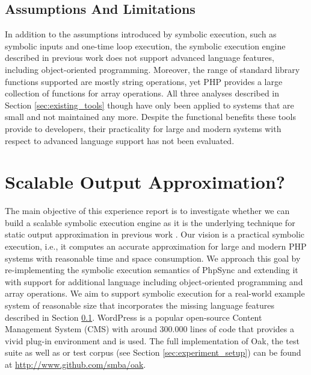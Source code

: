 \documentclass[sigconf]{acmart}
\renewcommand{\sf}[1]{\textsf{#1}}
\begin{document}
\subsection{Assumptions And Limitations}\label{sec:limitations}
In addition to the assumptions introduced by symbolic execution, such as
symbolic inputs and one-time loop execution, the symbolic execution
engine described in previous work \cite{Nguyen:2014:BCG:2635868.2635928} does
not support advanced language features, including object-oriented programming. Moreover, the range of
standard library functions supported are mostly string operations, yet PHP
provides a large collection of functions for array operations.
All three analyses described in Section \ref{sec:existing_tools} though have
only been applied to systems that are small and not maintained any more. Despite the
functional benefits these tools provide to developers, their practicality for
large and modern systems with respect to advanced language support has not been
evaluated.

\section{Scalable Output Approximation?} \label{sec:3}
The main objective of this experience report is to investigate whether we can
build a scalable symbolic execution engine as it is the underlying technique
for static output approximation in previous work
\cite{Nguyen:2011:AFH:2190078.2190142,Nguyen:2014:BCG:2635868.2635928,Nguyen:2015:CPS:2786805.2786872,Nguyen:2015:VIS:2819009.2819140}.
Our vision is a practical symbolic execution, i.e., it computes an accurate
approximation for large and modern PHP systems with reasonable time and space consumption.
We approach this goal by re-implementing the symbolic execution semantics  of
\sf{PhpSync} \cite{Nguyen:2014:BCG:2635868.2635928} and extending it with support for additional language
including object-oriented programming and array operations. We aim to support symbolic
execution for a real-world example system of reasonable size that incorporates
the missing language features described in Section \ref{sec:limitations}.
\textsf{WordPress} is a popular open-source Content Management System (CMS)
with around 300.000 lines of code that provides a vivid
plug-in environment and is used.  The full implementation of \sf{Oak}, the test
suite as well as or test corpus (see Section \ref{sec:experiment_setup}) can be found at
\url{http://www.github.com/smba/oak}.
\end{document}
